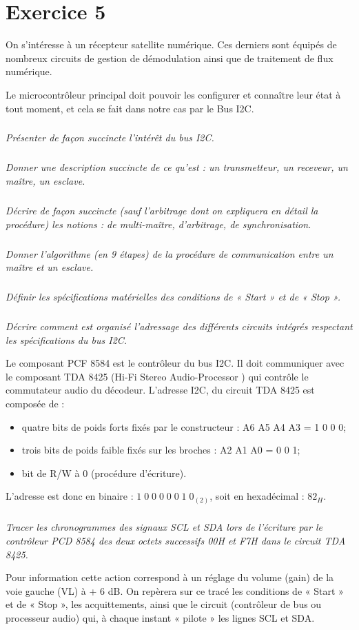 \documentclass[10pt]{article}
\begin{document}
\section{Exercice 5}
\setcounter{subparagraph}{0}

On s’intéresse à un récepteur satellite numérique. Ces derniers sont équipés de nombreux circuits de gestion de démodulation ainsi que de traitement de flux numérique.

Le microcontrôleur principal doit pouvoir les configurer et connaître leur état à tout moment, et cela se fait dans notre cas par le Bus I2C.
\subparagraph{}
\textit{Présenter de façon succincte l’intérêt du bus I2C.}

\subparagraph{}
\textit{Donner une description succincte de ce qu’est : un transmetteur, un receveur, un maître, un esclave.}
\subparagraph{}
\textit{Décrire de façon succincte (sauf l’arbitrage dont on expliquera en détail la procédure) les notions : de multi-maître, d’arbitrage, de synchronisation.}
\subparagraph{}
\textit{Donner l’algorithme (en 9 étapes) de la procédure de communication entre un maître et un esclave.}
\subparagraph{}
\textit{Définir les spécifications matérielles des conditions de « Start » et de « Stop ».}
\subparagraph{}
\textit{Décrire comment est organisé l’adressage des différents circuits intégrés respectant les spécifications du bus I2C.}

Le composant PCF 8584 est le contrôleur du bus I2C. Il doit communiquer avec le composant TDA 8425 (Hi-Fi Stereo Audio-Processor ) qui contrôle le commutateur audio du décodeur.
L’adresse I2C, du circuit TDA 8425 est composée de :
\begin{itemize}
\item quatre bits de poids forts fixés par le constructeur : A6 A5 A4 A3 = 1 0 0 0;
\item trois bits de poids faible fixés sur les broches : A2 A1 A0 = 0 0 1;
\item bit de R/W à 0 (procédure d’écriture).
\end{itemize}

L’adresse est donc en binaire : $1\; 0\; 0\; 0\; 0\; 0\; 1\; 0_{(2)}$, soit en hexadécimal : $82_H$.

\subparagraph{}
\textit{Tracer les chronogrammes des signaux SCL et SDA lors de l’écriture par le contrôleur PCD
8584 des deux octets successifs 00H et F7H dans le circuit TDA 8425.}

Pour information cette action correspond à un réglage du volume (gain) de la voie gauche (VL) à + 6 dB.
On repèrera sur ce tracé les conditions de « Start » et de « Stop », les acquittements, ainsi que le circuit (contrôleur de bus ou processeur audio) qui, à chaque instant « pilote » les lignes SCL et SDA.
\end{document}

